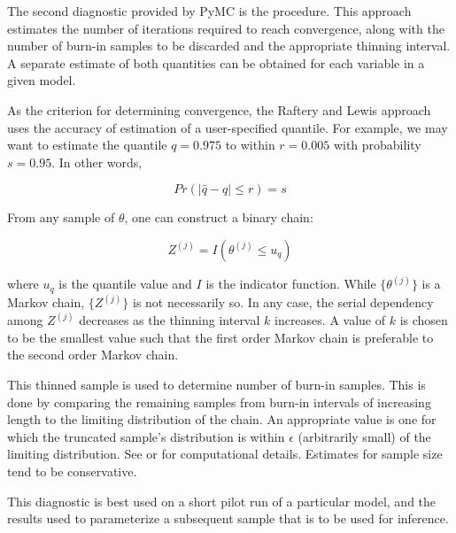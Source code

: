 The second diagnostic provided by PyMC is the \citet{raftery} procedure. This approach estimates the number of iterations required to reach convergence, along with the number of burn-in samples to be discarded and the appropriate thinning interval. A separate estimate of both quantities can be obtained for each variable in a given model.

As the criterion for determining convergence, the Raftery and Lewis approach uses the accuracy of estimation of a user-specified quantile. For example, we may want to estimate the quantile $q=0.975$ to within $r=0.005$ with probability $s=0.95$. In other words,

\begin{equation}
	Pr(|\hat{q}-q| \le r) = s
\end{equation}

From any sample of $\theta$, one can construct a binary chain:

\begin{equation}
	Z^{(j)} = I(\theta^{(j)} \le u_q)
\end{equation}

where $u_q$ is the quantile value and $I$ is the indicator function. While $\{\theta^{(j)}\}$ is a Markov chain, $\{Z^{(j)}\}$ is not necessarily so. In any case, the serial dependency among $Z^{(j)}$ decreases as the thinning interval $k$ increases. A value of $k$ is chosen to be the smallest value such that the first order Markov chain is preferable to the second order Markov chain.

This thinned sample is used to determine number of burn-in samples. This is done by comparing the remaining samples from burn-in intervals of increasing length to the limiting distribution of the chain. An appropriate value is one for which the truncated sample's distribution is within $\epsilon$ (arbitrarily small) of the limiting distribution. See \citet{raftery} or \citet{Gamerman:1997tb} for computational details. Estimates for sample size tend to be conservative.

This diagnostic is best used on a short pilot run of a particular model, and the results used to parameterize a subsequent sample that is to be used for inference.


